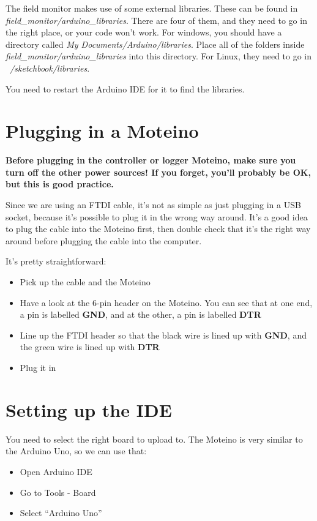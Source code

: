 \documentclass[10pt]{article}
\begin{document}
The field monitor makes use of some external libraries. These can be found in \textit{field\_monitor/arduino\_libraries}. There are four of them, and they need to go in the right place, or your code won't work. For windows, you should have a directory called \textit{My Documents/Arduino/libraries}. Place all of the folders inside \textit{field\_monitor/arduino\_libraries} into this directory. For Linux, they need to go in \textit{~/sketchbook/libraries}. 

You need to restart the Arduino IDE for it to find the libraries.

\section{Plugging in a Moteino}

\textbf{Before plugging in the controller or logger Moteino, make sure you turn off the other power sources! If you forget, you'll probably be OK, but this is good practice.} \newline

Since we are using an FTDI cable, it's not as simple as just plugging in a USB socket, because it's possible to plug it in the wrong way around. It's a good idea to plug the cable into the Moteino first, then double check that it's the right way around before plugging the cable into the computer.

It's pretty straightforward:

\begin{itemize}
 \item Pick up the cable and the Moteino
 \item Have a look at the 6-pin header on the Moteino. You can see that at one end, a pin is labelled \textbf{GND}, and at the other, a pin is labelled \textbf{DTR}
 \item Line up the FTDI header so that the black wire is lined up with \textbf{GND}, and the green wire is lined up with \textbf{DTR}
 \item Plug it in
\end{itemize}

\section{Setting up the IDE}

You need to select the right board to upload to. The Moteino is very similar to the Arduino Uno, so we can use that:

\begin{itemize}
 \item Open Arduino IDE 
 \item Go to Tools - Board
 \item Select ``Arduino Uno''
\end{itemize}
\end{document}
